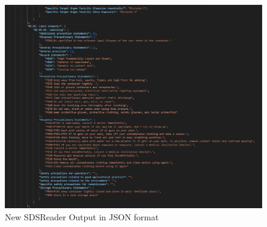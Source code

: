 \documentclass[a4paper,12pt,twoside]{report}
\begin{document}
\begin{figure}
		\includegraphics[width=\textwidth, keepaspectratio ]{images/newSDSReader}
	\caption[Old SDSReader]{New SDSReader Output in JSON format}
\label{newSDSReader}
\end{figure}
\end{document}
